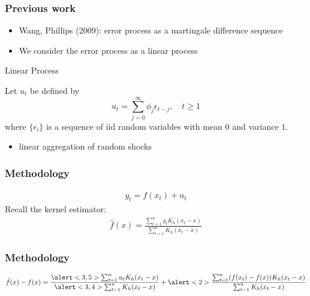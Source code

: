 \documentclass{beamer}
\begin{document}
\begin{frame}[c]\frametitle{Previous work}
  \begin{itemize}[<+->]
    \item Wang, Phillips (2009): error process as a \alert{martingale difference sequence}
    \item We consider the error process as a \alert{linear process} 
  \end{itemize}
\end{frame}

\begin{frame}[t]{Linear Process}
  \begin{definition}
    Let $u_t$ be defined by \[ u_t = \sum_{j=0}^{\infty} \phi_j \epsilon_{t-j}, \quad t \geq 1 \] where $\{\epsilon_i\}$ is a sequence of iid random variables with mean $0$ and variance $1$.
  \end{definition}
  \begin{itemize}
    \item<2-> linear aggregation of random shocks
  \end{itemize}
\end{frame}

\begin{frame}[c]\frametitle{Methodology}
  \begin{align*}
    y_t = f(x_t) + u_t
  \end{align*}
  Recall the kernel estimator:
  \begin{align*}
    \hat{f}(x) = \frac{\sum_{t=1}^{n} y_t K_h(x_t-x)}{\sum_{t=1}^{n} K_h(x_t-x)} 
  \end{align*}
\end{frame}
\begin{frame}[c]\frametitle{Methodology}
  \begin{equation*}
    \hat{f}(x) - f(x) = \frac{\alert<3,5>{\sum_{t=1}^n u_t K_h(x_t - x)}}{\alert<3,4>{\sum_{t=1}^n K_h(x_t - x)}} + \alert<2>{\frac{\sum_{t=1}^n (f(x_t)-f(x)) K_h(x_t - x)}{\sum_{t=1}^n K_h(x_t - x)}}
  \end{equation*}
\end{frame}

\fi
\end{document}
